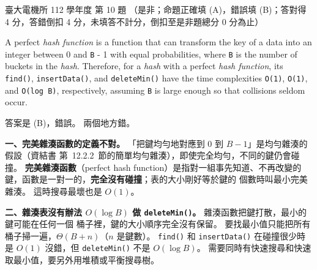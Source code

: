 \begin{pastexam}[label={px:ntu-112-ee-ds-10}]{臺大電機所 112 學年度 第 10 題}
（是非；命題正確填 (A)，錯誤填 (B)；答對得 4 分，答錯倒扣 4 分，未填答不計分，倒扣至是非題總分 0 分為止）

A perfect \textit{hash function} is a function that can transform the key of a data into an integer between 0 and \texttt{B} - 1 with equal probabilities, where \texttt{B} is the number of buckets in the \textit{hash}. Therefore, for a \textit{hash} with a perfect \textit{hash function}, its \texttt{find()}, \texttt{insertData()}, and \texttt{deleteMin()} have the time complexities \texttt{O(1)}, \texttt{O(1)}, and \texttt{O(log B)}, respectively, assuming \texttt{B} is large enough so that collisions seldom occur.
\end{pastexam}

\begin{pastsoln}
答案是 (B)，錯誤。 兩個地方錯。

\textbf{一、完美雜湊函數的定義不對。} 「把鍵均勻地對應到 $0$ 到 $B - 1$」是均勻雜湊的假設（資結書
第~12.2.2~節的簡單均勻雜湊），即使完全均勻，不同的鍵仍會碰撞。 \textbf{完美雜湊函數}（perfect hash
function）是指對一組事先知道、不再改變的鍵，函數是一對一的，\textbf{完全沒有碰撞}；表的大小剛好等於鍵的
個數時叫最小完美雜湊。 這時搜尋最壞也是 $O(1)$。

\textbf{二、雜湊表沒有辦法 $O(\log B)$ 做 \texttt{deleteMin()}。} 雜湊函數把鍵打散，最小的鍵可能在任何一個
桶子裡，鍵的大小順序完全沒有保留。 要找最小值只能把所有桶子掃一遍，$\Theta(B + n)$（$n$ 是鍵數）。
\texttt{find()} 和 \texttt{insertData()} 在碰撞很少時是 $O(1)$ 沒錯，但 \texttt{deleteMin()} 不是
$O(\log B)$。 需要同時有快速搜尋和快速取最小值，要另外用堆積或平衡搜尋樹。
\end{pastsoln}
